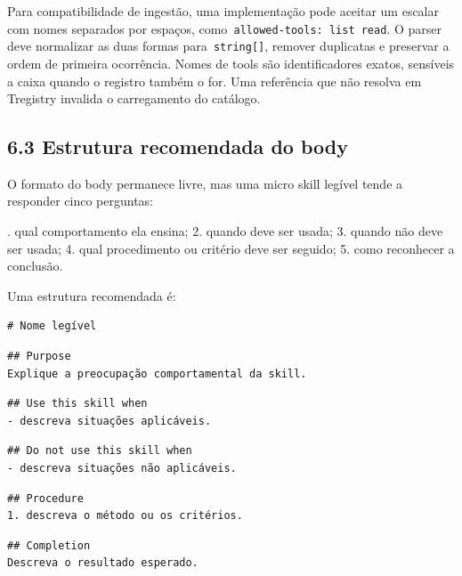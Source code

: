 \documentclass[12pt,a4paper]{article}
\begin{document}
Para compatibilidade de ingestão, uma implementação pode aceitar um escalar com nomes separados por espaços, como\texttt{ allowed-tools: list read}. O parser deve normalizar as duas formas para\texttt{ string[]}, remover duplicatas e preservar a ordem de primeira ocorrência. Nomes de tools são identificadores exatos, sensíveis a caixa quando o registro também o for. Uma referência que não resolva em Tregistry invalida o carregamento do catálogo.


\subsection*{6.3 Estrutura recomendada do body}

O formato do body permanece livre, mas uma micro skill legível tende a responder cinco perguntas:


. qual comportamento ela ensina; 2. quando deve ser usada; 3. quando não deve ser usada; 4. qual procedimento ou critério deve ser seguido; 5. como reconhecer a conclusão.\par

Uma estrutura recomendada é:


\begin{Verbatim}[breaklines=true,breakanywhere=true,fontsize=\small]
# Nome legível
\end{Verbatim}


\begin{Verbatim}[breaklines=true,breakanywhere=true,fontsize=\small]
## Purpose
Explique a preocupação comportamental da skill.
\end{Verbatim}

\begin{Verbatim}[breaklines=true,breakanywhere=true,fontsize=\small]
## Use this skill when
- descreva situações aplicáveis.
\end{Verbatim}

\begin{Verbatim}[breaklines=true,breakanywhere=true,fontsize=\small]
## Do not use this skill when
- descreva situações não aplicáveis.
\end{Verbatim}

\begin{Verbatim}[breaklines=true,breakanywhere=true,fontsize=\small]
## Procedure
1. descreva o método ou os critérios.
\end{Verbatim}

\begin{Verbatim}[breaklines=true,breakanywhere=true,fontsize=\small]
## Completion
Descreva o resultado esperado.
\end{Verbatim}
\end{document}
